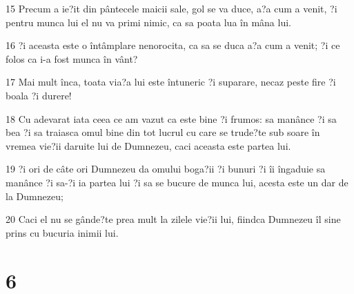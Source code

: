 \par 15 Precum a ie?it din pântecele maicii sale, gol se va duce, a?a cum a venit, ?i pentru munca lui el nu va primi nimic, ca sa poata lua în mâna lui.
\par 16 ?i aceasta este o întâmplare nenorocita, ca sa se duca a?a cum a venit; ?i ce folos ca i-a fost munca în vânt?
\par 17 Mai mult înca, toata via?a lui este întuneric ?i suparare, necaz peste fire ?i boala ?i durere!
\par 18 Cu adevarat iata ceea ce am vazut ca este bine ?i frumos: sa manânce ?i sa bea ?i sa traiasca omul bine din tot lucrul cu care se trude?te sub soare în vremea vie?ii daruite lui de Dumnezeu, caci aceasta este partea lui.
\par 19 ?i ori de câte ori Dumnezeu da omului boga?ii ?i bunuri ?i îi îngaduie sa manânce ?i sa-?i ia partea lui ?i sa se bucure de munca lui, acesta este un dar de la Dumnezeu;
\par 20 Caci el nu se gânde?te prea mult la zilele vie?ii lui, fiindca Dumnezeu îl sine prins cu bucuria inimii lui.

\chapter{6}

